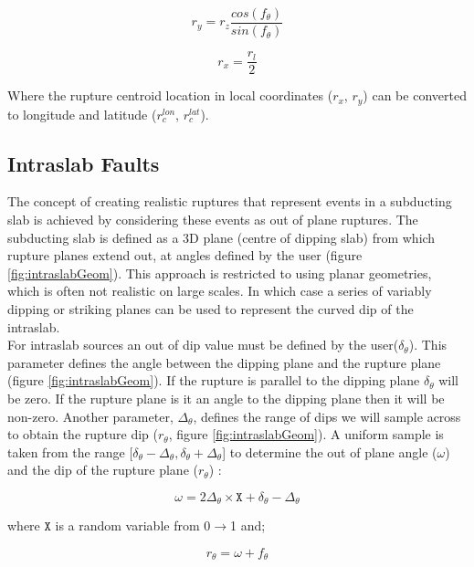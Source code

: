 \begin{equation}
r_y = r_z  \frac{cos(f_\theta)}{sin(f_\theta)}
\end{equation}

\begin{equation}
r_x = \frac{r_l}{2}
\end{equation}

Where the rupture centroid location in local coordinates ($r_x$, $r_y$) can be converted to longitude and latitude ($r_c^{lon}$, $r_c^{lat}$).

\subsection{Intraslab Faults}

The concept of creating realistic ruptures that represent events in a subducting slab is achieved by considering these events as 
out of plane ruptures. The subducting slab is defined as a 3D plane (centre of dipping slab) from which rupture planes extend out, at angles defined by
the user (figure \ref{fig:intraslabGeom}). This approach is restricted to using planar geometries, which is often not realistic on large scales. In which case 
a series of variably dipping or striking planes can be used to represent the curved dip of the intraslab. \\

For intraslab sources an out of dip value must be defined by the user($\delta_\theta$). 
This parameter defines the angle between the dipping plane and the rupture plane (figure \ref{fig:intraslabGeom}). If the rupture 
is parallel to the dipping plane $\delta_\theta$ will be zero. If the rupture plane is it an angle to the dipping plane then it 
will be non-zero. Another parameter, $\Delta_\theta$, defines the range of dips we will sample across to obtain the rupture 
dip ($r_\theta$, figure \ref{fig:intraslabGeom}).
A uniform sample is taken from the range [$\delta_\theta - \Delta_\theta, \delta_\theta + \Delta_\theta$] to determine 
the out of plane angle ($\omega$) and the dip of the rupture plane ($r_\theta$) :


\begin{equation}
\omega = 2\Delta_\theta  \times \mathtt{X} + \delta_\theta - \Delta_\theta
\end{equation}

where $\mathtt{X}$ is a random variable from 0$\rightarrow$1 and;

\begin{equation}
r_\theta = \omega + f_\theta
\end{equation}

